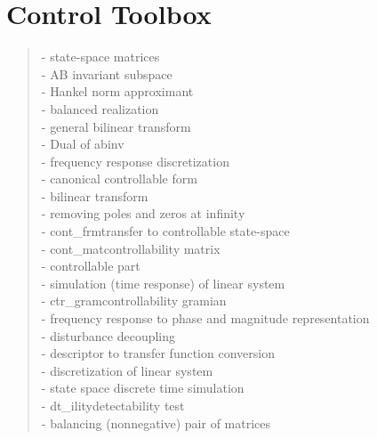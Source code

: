 \chapter*{Control Toolbox}

\begin{quote}
\noindent
 - {state-space matrices} \\  
 - {AB invariant subspace} \\  
 - {Hankel norm approximant} \\  
 - {balanced realization} \\  
 - {general bilinear transform} \\  
 - { Dual of abinv} \\  
 - {frequency response discretization} \\  
 - {canonical controllable form} \\  
 - {bilinear transform} \\  
 - {removing poles and zeros at infinity} \\  
 - {cont_frm}{transfer to controllable state-space} \\  
 - {cont_mat}{controllability matrix} \\  
 - {controllable part} \\  
 - {simulation (time response) of linear system} \\  
 - {ctr_gram}{controllability gramian} \\  
 - {frequency response to phase and magnitude representation} \\  
 - {disturbance decoupling} \\  
 - {descriptor to transfer function conversion} \\  
 - { discretization of linear system} \\  
 - { state space discrete time simulation} \\  
 - {dt_ility}{detectability test} \\  
 - {balancing (nonnegative) pair of matrices} \\  

\end{quote}
